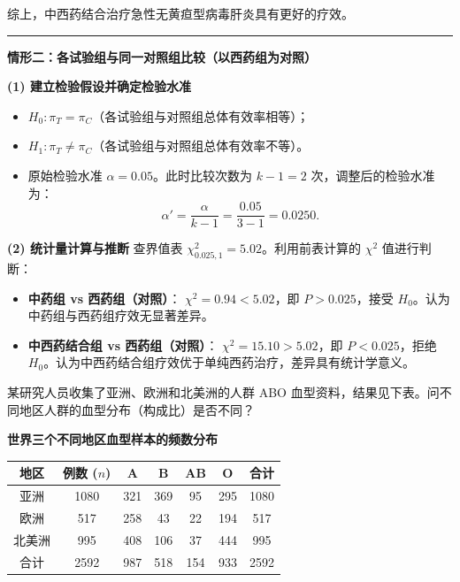 \documentclass[lang=cn,10pt]{elegantbook}
\begin{document}
\begin{solution}
综上，中西药结合治疗急性无黄疸型病毒肝炎具有更好的疗效。

\bigskip
\hrule
\bigskip

\textbf{情形二：各试验组与同一对照组比较（以西药组为对照）}

\textbf{(1) 建立检验假设并确定检验水准}
\begin{itemize}
    \item $H_0: \pi_T = \pi_C$（各试验组与对照组总体有效率相等）；
    \item $H_1: \pi_T \neq \pi_C$（各试验组与对照组总体有效率不等）。
    \item 原始检验水准 $\alpha = 0.05$。此时比较次数为 $k-1=2$ 次，调整后的检验水准为：
    \[
    \alpha' = \frac{\alpha}{k-1} = \frac{0.05}{3-1} = 0.0250.
    \]
\end{itemize}

\textbf{(2) 统计量计算与推断}
查界值表 $\chi^2_{0.025,1} = 5.02$。利用前表计算的 $\chi^2$ 值进行判断：

\begin{itemize}
    \item \textbf{中药组 vs 西药组（对照）}：
    $\chi^2 = 0.94 < 5.02$，即 $P > 0.025$，接受 $H_0$。认为中药组与西药组疗效无显著差异。
    
    \item \textbf{中西药结合组 vs 西药组（对照）}：
    $\chi^2 = 15.10 > 5.02$，即 $P < 0.025$，拒绝 $H_0$。认为中西药结合组疗效优于单纯西药治疗，差异具有统计学意义。
\end{itemize}
\end{solution}


\begin{exercise}
某研究人员收集了亚洲、欧洲和北美洲的人群 ABO 血型资料，结果见下表。问不同地区人群的血型分布（构成比）是否不同？

\begin{center}
\textbf{世界三个不同地区血型样本的频数分布}
\medskip

\begin{tabular}{ccccccc}
  \toprule
  地区 & 例数 ($n$) & A & B & AB & O & 合计 \\
  \midrule
  亚洲 & 1080 & 321 & 369 & 95 & 295 & 1080 \\
  欧洲 & 517  & 258 & 43  & 22 & 194 & 517 \\
  北美洲 & 995 & 408 & 106 & 37 & 444 & 995 \\
  \midrule
  合计 & 2592 & 987 & 518 & 154 & 933 & 2592 \\
  \bottomrule
\end{tabular}
\end{center}
\end{exercise}
\end{document}
